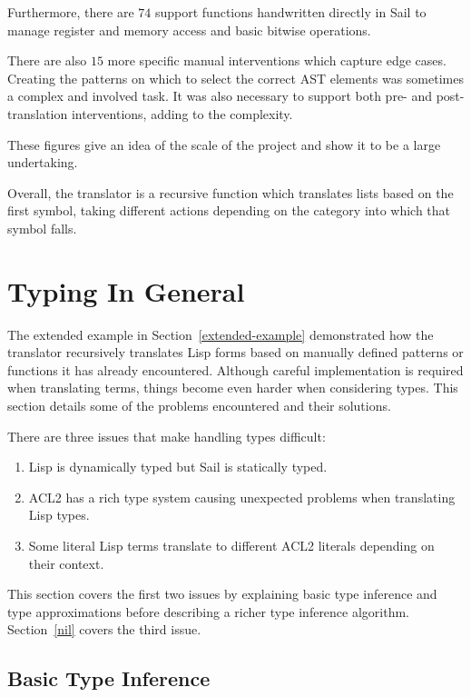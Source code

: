 \documentclass[a4paper,12pt,twoside,openright]{report}
\begin{document}
Furthermore, there are $74$ support functions handwritten directly in Sail to manage register and memory access and basic bitwise operations.

There are also $15$ more specific manual interventions which capture edge cases.  Creating the patterns on which to select the correct AST elements was sometimes a complex and involved task.  It was also necessary to support both pre- and post-translation interventions, adding to the complexity.

These figures give an idea of the scale of the project and show it to be a large undertaking.

Overall, the translator is a recursive function which translates lists based on the first symbol, taking different actions depending on the category into which that symbol falls.

\hypertarget{typing}{
\section{Typing In General}\label{typing}}

The extended example in Section~\ref{extended-example} demonstrated how the translator recursively translates Lisp forms based on manually defined patterns or functions it has already encountered.  Although careful implementation is required when translating terms, things become even harder when considering types.  This section details some of the problems encountered and their solutions.

There are three issues that make handling types difficult:

\begin{enumerate}
	\item Lisp is dynamically typed but Sail is statically typed.
	\item ACL2 has a rich type system causing unexpected problems  when translating Lisp types.
	\item Some literal Lisp terms translate to different ACL2 literals depending on their context.
\end{enumerate}

This section covers the first two issues by explaining basic type inference and type approximations before describing a richer type inference algorithm.  Section~\ref{nil} covers the third issue.

\hypertarget{basic-types}{
\subsection{Basic Type Inference}\label{basic-types}}
\end{document}
